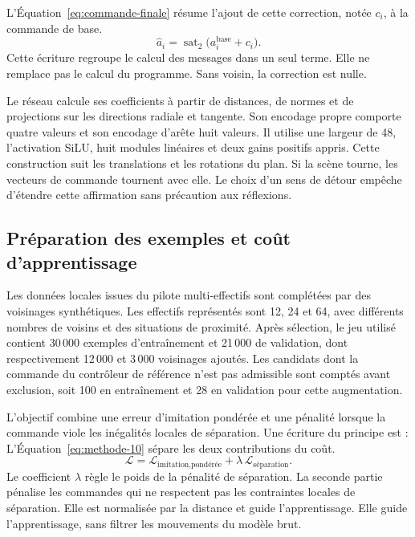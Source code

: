 L'Équation~\eqref{eq:commande-finale} résume l'ajout de cette correction, notée $c_i$, à la commande de base.
\begin{equation}
\widehat a_i=\operatorname{sat}_2\big(a_i^{\mathrm{base}}+c_i\big).
\label{eq:commande-finale}
\end{equation}
Cette écriture regroupe le calcul des messages dans un seul terme. Elle ne remplace pas le calcul du programme. Sans voisin, la correction est nulle.

Le réseau calcule ses coefficients à partir de distances, de normes et de projections sur les directions radiale et tangente. Son encodage propre comporte quatre valeurs et son encodage d'arête huit valeurs. Il utilise une largeur de 48, l'activation SiLU, huit modules linéaires et deux gains positifs appris. Cette construction suit les translations et les rotations du plan. Si la scène tourne, les vecteurs de commande tournent avec elle. Le choix d'un sens de détour empêche d'étendre cette affirmation sans précaution aux réflexions.

\subsection{Préparation des exemples et coût d'apprentissage}
Les données locales issues du pilote multi-effectifs sont complétées par des voisinages synthétiques. Les effectifs représentés sont 12, 24 et 64, avec différents nombres de voisins et des situations de proximité. Après sélection, le jeu utilisé contient 30\,000 exemples d'entraînement et 21\,000 de validation, dont respectivement 12\,000 et 3\,000 voisinages ajoutés. Les candidats dont la commande du contrôleur de référence n'est pas admissible sont comptés avant exclusion, soit 100 en entraînement et 28 en validation pour cette augmentation.

L'objectif combine une erreur d'imitation pondérée et une pénalité lorsque la commande viole les inégalités locales de séparation. Une écriture du principe est :
L'Équation~\eqref{eq:methode-10} sépare les deux contributions du coût.
\begin{equation}
\mathcal{L}=\mathcal{L}_{\text{imitation,pondérée}}+
\lambda\,\mathcal{L}_{\text{séparation}}.
\label{eq:methode-10}
\end{equation}
Le coefficient $\lambda$ règle le poids de la pénalité de séparation. La seconde partie pénalise les commandes qui ne respectent pas les contraintes locales de séparation. Elle est normalisée par la distance et guide l'apprentissage. Elle guide l'apprentissage, sans filtrer les mouvements du modèle brut.

